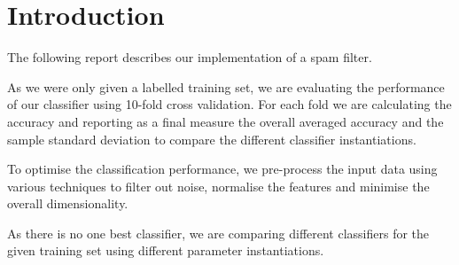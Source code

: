 \section{Introduction}
The following report describes our implementation of a spam filter.

As we were only given a labelled training set, we are evaluating the performance of our classifier using 10-fold cross validation.
For each fold we are calculating the accuracy and reporting as a final measure the overall averaged accuracy and the sample standard deviation to compare the different classifier instantiations.

To optimise the classification performance, we pre-process the input data using various techniques to filter out noise, normalise the features and minimise the overall dimensionality.

As there is no one best classifier, we are comparing different classifiers for the given training set using different parameter instantiations.

